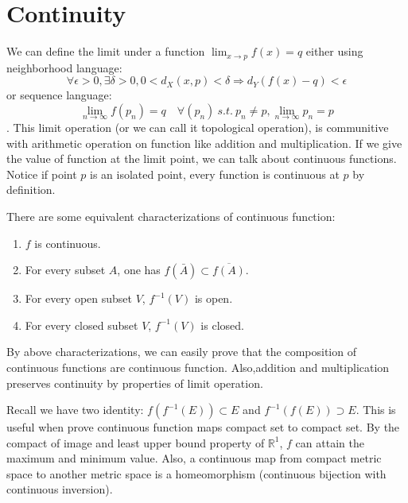 % 
\chapter{Continuity}
We can define the limit under a function $\lim_{x\to p}f(x)=q$ either using neighborhood language:
\begin{equation*}
    \forall \epsilon>0, \exists \delta>0, 0<d_X(x,p)<\delta \Rightarrow d_Y(f(x)-q)<\epsilon
\end{equation*}
or sequence language:
\begin{equation*}
    \lim_{n\to\infty}f(p_n)=q \quad \forall (p_n)~s.t.~p_n\neq p, \lim_{n\to\infty}p_n=p 
\end{equation*}
. This limit operation (or we can call it topological operation), is communitive with arithmetic operation on function like addition and multiplication. If we give the value of function at the limit point, we can talk about continuous functions. Notice if point $p$ is an isolated point, every function is continuous at $p$ by definition. \par
There are some equivalent characterizations of continuous function: 
\begin{enumerate}
    \item $f$ is continuous.
    \item For every subset $A$, one has $f(\bar{A})\subset\overline{f(A)}$.
    \item For every open subset $V$, $f^{-1}(V)$ is open.
    \item For every closed subset $V$, $f^{-1}(V)$ is closed.
\end{enumerate}
By above characterizations, we can easily prove that the composition of continuous functions are continuous function. Also,addition and multiplication preserves continuity by properties of limit operation.\par
Recall we have two identity: $f(f^{-1}(E))\subset E$ and $f^{-1}(f(E))\supset E$. This is useful when prove continuous function maps compact set to compact set. By the compact of image and least upper bound property of $\mathbb{R}^1$, $f$ can attain the maximum and minimum value. Also, a continuous map from compact metric space to another metric space is a homeomorphism (continuous bijection with continuous inversion).
